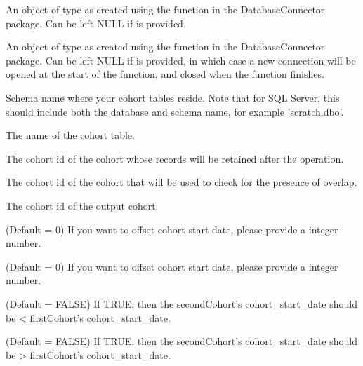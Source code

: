\documentclass[a4paper]{book}
\begin{document}
%
\begin{Arguments}
\begin{ldescription}
\item[\code{connectionDetails}] An object of type  as created using the
 function in the
DatabaseConnector package. Can be left NULL if  is
provided.

\item[\code{connection}] An object of type  as created using the
 function in the
DatabaseConnector package. Can be left NULL if 
is provided, in which case a new connection will be opened at the start
of the function, and closed when the function finishes.

\item[\code{cohortDatabaseSchema}] Schema name where your cohort tables reside. Note that for SQL Server,
this should include both the database and schema name, for example
'scratch.dbo'.

\item[\code{cohortTable}] The name of the cohort table.

\item[\code{firstCohortId}] The cohort id of the cohort whose records will be retained after the operation.

\item[\code{secondCohortId}] The cohort id of the cohort that will be used to check for the presence of overlap.

\item[\code{newCohortId}] The cohort id of the output cohort.

\item[\code{offsetCohortStartDate}] (Default = 0) If you want to offset cohort start date, please provide a integer number.

\item[\code{offsetCohortEndDate}] (Default = 0) If you want to offset cohort start date, please provide a integer number.

\item[\code{restrictSecondCohortStartBeforeFirstCohortStart}] (Default = FALSE) If TRUE, then the secondCohort's cohort\_start\_date
should be < firstCohort's cohort\_start\_date.

\item[\code{restrictSecondCohortStartAfterFirstCohortStart}] (Default = FALSE) If TRUE, then the secondCohort's cohort\_start\_date
should be > firstCohort's cohort\_start\_date.


\end{ldescription}
\end{Arguments}
\end{document}
